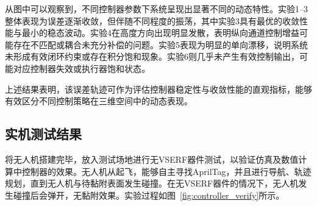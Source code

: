 从图中可以观察到，不同控制器参数下系统呈现出显著不同的动态特性。实验1–3整体表现为误差逐渐收敛，但伴随不同程度的振荡，其中实验3具有最优的收敛性能与最小的稳态波动。实验4在高度方向出现明显发散，表明纵向通道控制增益可能存在不匹配或耦合未充分补偿的问题。实验5表现为明显的单向漂移，说明系统未形成有效闭环约束或存在积分饱和现象。实验6则几乎未产生有效控制输出，可能对应控制器失效或执行器饱和状态。

上述结果表明，该误差轨迹可作为评估控制器稳定性与收敛性能的直观指标，能够有效区分不同控制策略在三维空间中的动态表现。

\subsection{实机测试结果}
将无人机搭建完毕，放入测试场地进行无VSERF器件测试，以验证仿真及数值计算中控制器的效果。无人机从起飞，能够自主寻找AprilTag，并且进行导航、轨迹规划，直到无人机与待黏附表面发生碰撞。在无VSERF器件的情况下，无人机发生碰撞后会弹开，无黏附效果。实验过程如图~\ref{fig:controller_verify}所示。

